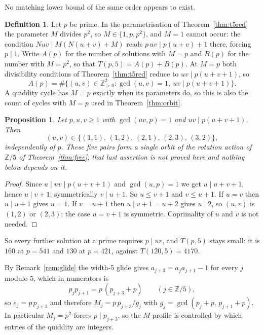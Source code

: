 \documentclass[11pt]{article}
\theoremstyle{plain}
\newtheorem{proposition}[theorem]{Proposition}
\theoremstyle{definition}
\newtheorem{definition}[theorem]{Definition}
\newcommand{\Z}{\mathbb{Z}}
\begin{document}
No matching lower bound of the same order appears to exist.

\begin{definition}\label{def:AB}
Let $p$ be prime. In the parametrisation of Theorem~\ref{thm:t5red} the parameter $M$ divides
$p^2$, so $M\in\{1,p,p^2\}$, and $M=1$ cannot occur: the condition $Nuv\mid M(N(u+v)+M)$ reads
$p\,uv\mid p(u+v)+1$ there, forcing $p\mid1$. Write $A(p)$ for the number of solutions with
$M=p$ and $B(p)$ for the number with $M=p^2$, so that $T(p,5)=A(p)+B(p)$. At $M=p$ both
divisibility conditions of Theorem~\ref{thm:t5red} reduce to $uv\mid p(u+v+1)$, so
\[
  A(p)=\#\{(u,v)\in\Z_{>0}^2:\gcd(u,v)=1,\ uv\mid p(u+v+1)\}.
\]
A quiddity cycle has $M=p$ exactly when its parameters do, so this is also the count of cycles
with $M=p$ used in Theorem~\ref{thm:orbit}.
\end{definition}

\begin{proposition}\label{prop:rigid5}
Let $p,u,v\ge1$ with $\gcd(uv,p)=1$ and $uv\mid p(u+v+1)$. Then
\[
  (u,v)\in\{(1,1),\,(1,2),\,(2,1),\,(2,3),\,(3,2)\},
\]
independently of $p$. These five pairs form a single orbit of the rotation action of $\Z/5$ of
Theorem~\ref{thm:free}; that last assertion is
not proved here and nothing below depends on it.
\end{proposition}

\begin{proof}
Since $u\mid uv\mid p(u+v+1)$ and $\gcd(u,p)=1$ we get $u\mid u+v+1$, hence $u\mid v+1$;
symmetrically $v\mid u+1$. So $u\le v+1$ and $v\le u+1$. If $u=v$ then $u\mid u+1$ gives
$u=1$. If $v=u+1$ then $u\mid v+1=u+2$ gives $u\mid2$, so $(u,v)$ is $(1,2)$ or $(2,3)$;
the case $u=v+1$ is symmetric. Coprimality of $u$ and $v$ is not needed.
\end{proof}

So every further solution at a prime requires $p\mid uv$, and $T(p,5)$ stays small: it is
$160$ at $p=541$ and $130$ at $p=421$, against $T(120,5)=4170$.

By Remark~\ref{rem:glide} the width-5 glide gives $a_{j+3}=a_ja_{j+1}-1$ for every $j$
modulo $5$, which in numerators is
\begin{equation}\label{eq:w5cyc}
  p_jp_{j+1}=p\,(p_{j+3}+p) \qquad (j\in\Z/5),
\end{equation}
so $e_j=p\,p_{j+3}$ and therefore $M_j=p\,p_{j+3}/g_j$ with
$g_j=\gcd(p_j+p,\,p_{j+1}+p)$. In particular $M_j=p^2$ forces $p\mid p_{j+3}$, so the
$M$-profile is controlled by which entries of the quiddity are integers.
\end{document}
